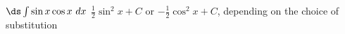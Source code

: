 {$\ds \int\sin x\cos x\ dx$}
{$\frac12\sin^2x+C$ or $-\frac12\cos^2x+C$, depending on the choice of substitution}
